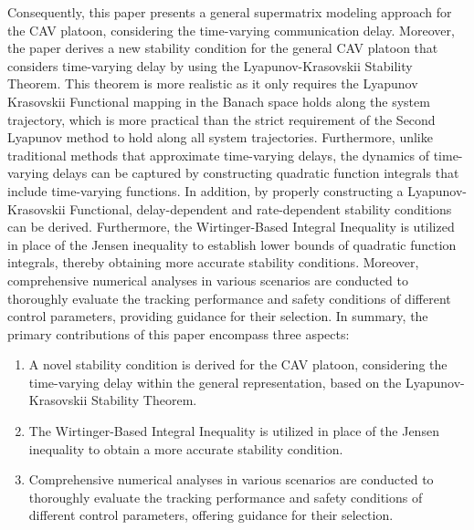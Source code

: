\documentclass[journal]{IEEEtran}
\begin{document}
Consequently, this paper presents a general supermatrix modeling approach for the CAV platoon, considering the time-varying communication delay. Moreover, the paper derives a new stability condition for the general CAV platoon that considers time-varying delay by using the Lyapunov-Krasovskii Stability Theorem. This theorem is more realistic as it only requires the Lyapunov Krasovskii Functional mapping in the Banach space holds along the system trajectory, which is more practical than the strict requirement of the Second Lyapunov method to hold along all system trajectories. Furthermore, unlike traditional methods that approximate time-varying delays, the dynamics of time-varying delays can be captured by constructing quadratic function integrals that include time-varying functions. In addition, by properly constructing a Lyapunov-Krasovskii Functional, delay-dependent and rate-dependent stability conditions can be derived. Furthermore, the Wirtinger-Based Integral Inequality is utilized in place of the Jensen inequality to establish lower bounds of quadratic function integrals, thereby obtaining more accurate stability conditions. Moreover, comprehensive numerical analyses in various scenarios are conducted to thoroughly evaluate the tracking performance and safety conditions of different control parameters, providing guidance for their selection. In summary, the primary contributions of this paper encompass three aspects:
\begin{enumerate}
  \item A novel stability condition is derived for the CAV platoon, considering the time-varying delay within the general representation, based on the Lyapunov-Krasovskii Stability Theorem.
  \item The Wirtinger-Based Integral Inequality is utilized in place of the Jensen inequality to obtain a more accurate stability condition.
  \item Comprehensive numerical analyses in various scenarios are conducted to thoroughly evaluate the tracking performance and safety conditions of different control parameters, offering guidance for their selection.
  \end{enumerate}
\end{document}
